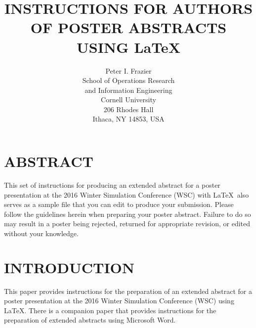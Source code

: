 \documentclass{wscposterproc}
\begin{document}
%
%
%

\title{INSTRUCTIONS FOR AUTHORS OF POSTER ABSTRACTS USING \LaTeX}

\author{Peter I. Frazier\\[12pt]
School of Operations Research\\ and Information Engineering \\
Cornell University\\
206 Rhodes Hall\\
Ithaca, NY 14853, USA
}

\maketitle


\section*{ABSTRACT}

This set of instructions for producing an extended abstract for a poster presentation at the 2016 Winter Simulation Conference (WSC) with \LaTeX\ also serves as a sample file that you can edit to produce your submission. Please follow the guidelines herein when preparing your poster abstract. Failure to do so may result in a poster being rejected, returned for appropriate revision, or edited without your knowledge.

\section{INTRODUCTION}
This paper provides instructions for the preparation of an extended abstract for a poster presentation at the 2016 Winter Simulation Conference (WSC) using \LaTeX. There is a companion paper that provides instructions for the preparation of extended abstracts using Microsoft Word.
\end{document}

